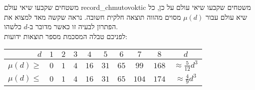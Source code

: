 \begin{surferIntroPage}{%
משטחים שקבעו שיאי עולם%
}{record_chmutovoktic}{%
משטחים שקבעו שיאי עולם%
}
    על כן, כל שיא עולם עבור $\mu(d)$ מסוים מהווה תוצאה חלקית חשובה. נראה שקשה מאד למצוא את הפתרון לבעיה זו כאשר מדובר ב-$d$ כלשהו.\\  לפניכם טבלה המסכמת מספר תוצאות ידועות:
    
   \begin{center}
      \begin{tabular}{r|cccccccc|c}
        $d$ & $1$ & $2$ & $3$ & $4$ & $5$ & $6$ & $7$ & $8$ & $d$\\
        \hline
        \hline
        \rule{0pt}{1.2em}$\mu(d)\ge$ & $0$ & $1$ & $4$ & $16$ & $31$ & $65$ &
        $99$ & $168$ & 
        $\approx \frac{5}{12}d^3$\\[0.3em]
        \hline
        \rule{0pt}{1.2em}$\mu(d)\le$ & $0$ & $1$ & $4$ & $16$ & $31$ & $65$ &
        $104$ & $174$ & $\approx \frac{4}{9}d^3$
      \end{tabular}
    \end{center}
\end{surferIntroPage}
